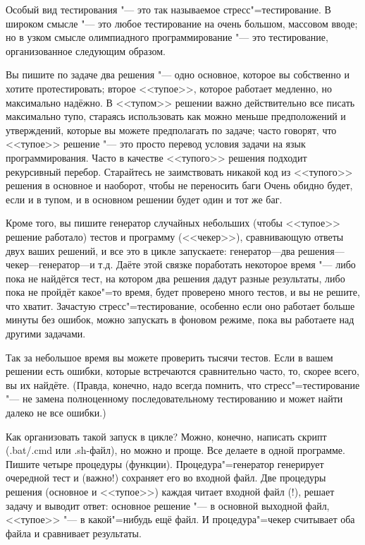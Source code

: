 \documentclass[a4paper,10pt]{problems}
\begin{document}
Особый вид тестирования "--- это так называемое стресс"=тестирование. В широком смысле "--- это любое тестирование на очень большом, массовом вводе; 
но в узком смысле олимпиадного программирование "--- это тестирование, организованное следующим образом.

Вы пишите по задаче два решения "--- одно основное, которое вы собственно и хотите протестировать; второе <<тупое>>, которое работает медленно, но максимально надёжно. 
В <<тупом>> решении важно действительно все писать максимально тупо, стараясь использовать как можно меньше предположений и утверждений, 
которые вы можете предполагать по задаче; часто говорят, что <<тупое>> решение "--- это просто перевод условия задачи на язык программирования.
Часто в качестве <<тупого>> решения подходит рекурсивный перебор. 
Старайтесь не заимствовать никакой код из <<тупого>> решения в основное и наоборот, чтобы не переносить баги
Очень обидно будет, если и в тупом, и в основном решении будет один и тот же баг.

Кроме того, вы пишите генератор случайных небольших (чтобы <<тупое>> решение работало) тестов и программу (<<чекер>>), сравнивающую ответы двух ваших решений,
и все это в цикле запускаете: генера\-тор---два решения---чекер---генератор---и т.д. 
Даёте этой связке поработать некоторое время "--- либо пока не найдётся тест, на котором два решения дадут разные результаты,
либо пока не пройдёт какое"=то время, будет проверено много тестов, и вы не решите, что хватит.  
Зачастую стресс"=тестирование, особенно если оно работает больше минуты без ошибок, можно запускать в фоновом режиме, пока вы работаете над другими задачами.

Так за небольшое время вы можете проверить тысячи тестов. 
Если в вашем решении есть ошибки, которые встречаются сравнительно часто, то, скорее всего, вы их найдёте.
(Правда, конечно, надо всегда помнить, что стресс"=тестирование "--- не замена полноценному последовательному тестированию и может найти далеко не все ошибки.)

Как организовать такой запуск в цикле? 
Можно, конечно, написать скрипт (.bat/.cmd или .sh-файл), но можно и проще. 
Все делаете в одной программе. Пишите четыре процедуры (функции). 
Процедура"=генератор генерирует очередной тест и (важно!) сохраняет его во входной файл.
Две процедуры решения (основное и <<тупое>>) каждая читает входной файл (!), решает задачу и выводит ответ: основное решение "--- в основной выходной файл,
<<тупое>> "--- в какой"=нибудь ещё файл.
И процедура"=чекер считывает оба файла и сравнивает результаты.
\end{document}
